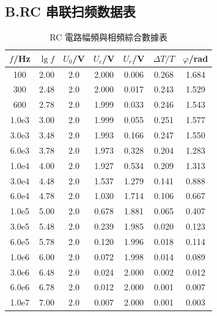 \documentclass[a4paper,8pt,twocolumn]{article}
\begin{document}
\subsection*{B.\;RC 串联扫频数据表}
\begin{table}[h]
\centering
\caption{RC 電路幅頻與相頻綜合數據表}
\begin{tabular}{ccccccc}
\hline
$f$/Hz & $\lg f$ & $U_0$/V & $U_c$/V & $U_r$/V & $\Delta T/T$ & $\varphi$/rad \\ \hline
100       & 2.00 & 2.0 & 2.000 & 0.006 & 0.268 & 1.684 \\
300       & 2.48 & 2.0 & 2.000 & 0.017 & 0.243 & 1.529 \\
600       & 2.78 & 2.0 & 1.999 & 0.033 & 0.246 & 1.543 \\
1.0e3     & 3.00 & 2.0 & 1.999 & 0.055 & 0.251 & 1.577 \\
3.0e3     & 3.48 & 2.0 & 1.993 & 0.166 & 0.247 & 1.550 \\
6.0e3     & 3.78 & 2.0 & 1.973 & 0.328 & 0.204 & 1.283 \\
1.0e4     & 4.00 & 2.0 & 1.927 & 0.534 & 0.209 & 1.313 \\
3.0e4     & 4.48 & 2.0 & 1.537 & 1.279 & 0.141 & 0.888 \\
6.0e4     & 4.78 & 2.0 & 1.030 & 1.714 & 0.106 & 0.667 \\
1.0e5     & 5.00 & 2.0 & 0.678 & 1.881 & 0.065 & 0.407 \\
3.0e5     & 5.48 & 2.0 & 0.239 & 1.985 & 0.020 & 0.123 \\
6.0e5     & 5.78 & 2.0 & 0.120 & 1.996 & 0.018 & 0.114 \\
1.0e6     & 6.00 & 2.0 & 0.072 & 1.998 & 0.014 & 0.089 \\
3.0e6     & 6.48 & 2.0 & 0.024 & 2.000 & 0.002 & 0.012 \\
6.0e6     & 6.78 & 2.0 & 0.012 & 2.000 & 0.001 & 0.007 \\
1.0e7     & 7.00 & 2.0 & 0.007 & 2.000 & 0.001 & 0.003 \\ \hline
\end{tabular}
\end{table}
\end{document}
